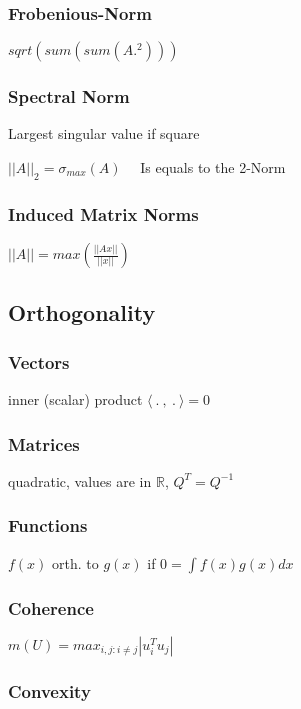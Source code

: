 \documentclass[a4paper,11pt,twocolumn]{article}
\begin{document}
\subsubsection{Frobenious-Norm}
$sqrt(sum(sum(A.^2)))$

\subsubsection{Spectral Norm} 
Largest singular value if square 

$||A||_2 = \sigma_{max}(A)$ 
~~Is equals to the 2-Norm

\subsubsection{Induced Matrix Norms}
$ ||A|| = max \left( \frac{ ||Ax|| }{ ||x|| } \right)$

\subsection{Orthogonality}

\subsubsection{Vectors} 

inner (scalar) product $\langle ~.~,~.~ \rangle = 0$

\subsubsection{Matrices} 

quadratic, values are in $\mathbb{R}$, $Q^T = Q^{-1}$

\subsubsection{Functions}

$f(x)$ orth. to $g(x)$ if $0 = \int f(x) g(x) dx $

\subsubsection{Coherence}

$m(U)= max_{i,j:i\neq j} | u_i^T u_j|$

\subsubsection{Convexity}
\end{document}
